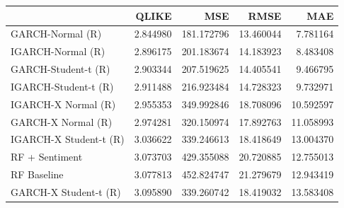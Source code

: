 \begin{table}[htbp]
\centering
\begin{tabular}{lrrrr}
\toprule
 & QLIKE & MSE & RMSE & MAE \\
\midrule
GARCH-Normal (R) & 2.844980 & 181.172796 & 13.460044 & 7.781164 \\
IGARCH-Normal (R) & 2.896175 & 201.183674 & 14.183923 & 8.483408 \\
GARCH-Student-t (R) & 2.903344 & 207.519625 & 14.405541 & 9.466795 \\
IGARCH-Student-t (R) & 2.911488 & 216.923484 & 14.728323 & 9.732971 \\
IGARCH-X Normal (R) & 2.955353 & 349.992846 & 18.708096 & 10.592597 \\
GARCH-X Normal (R) & 2.974281 & 320.150974 & 17.892763 & 11.058993 \\
IGARCH-X Student-t (R) & 3.036622 & 339.246613 & 18.418649 & 13.004370 \\
RF + Sentiment & 3.073703 & 429.355088 & 20.720885 & 12.755013 \\
RF Baseline & 3.077813 & 452.824747 & 21.279679 & 12.943419 \\
GARCH-X Student-t (R) & 3.095890 & 339.260742 & 18.419032 & 13.583408 \\
\bottomrule
\end{tabular}
\label{tab:forecast_loss_summary}
\end{table}
